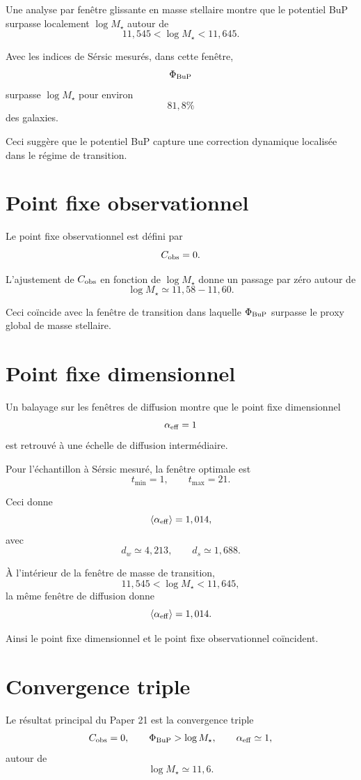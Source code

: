 \documentclass[11pt,a4paper]{article}
\begin{document}
Une analyse par fenêtre glissante en masse stellaire montre que le potentiel BuP surpasse localement \(\log M_\star\) autour de
\[
11,545<\log M_\star<11,645.
\]

Avec les indices de Sérsic mesurés, dans cette fenêtre,
\[
\Phi_{\rm BuP}
\]
surpasse \(\log M_\star\) pour environ
\[
81,8\%
\]
des galaxies.

Ceci suggère que le potentiel BuP capture une correction dynamique localisée dans le régime de transition.

\section{Point fixe observationnel}

Le point fixe observationnel est défini par
\[
C_{\rm obs}=0.
\]

L'ajustement de \(C_{\rm obs}\) en fonction de \(\log M_\star\) donne un passage par zéro autour de
\[
\log M_\star\simeq 11,58-11,60.
\]

Ceci coïncide avec la fenêtre de transition dans laquelle \(\Phi_{\rm BuP}\) surpasse le proxy global de masse stellaire.

\section{Point fixe dimensionnel}

Un balayage sur les fenêtres de diffusion montre que le point fixe dimensionnel
\[
\alpha_{\rm eff}=1
\]
est retrouvé à une échelle de diffusion intermédiaire.

Pour l'échantillon à Sérsic mesuré, la fenêtre optimale est
\[
t_{\min}=1,\qquad t_{\max}=21.
\]

Ceci donne
\[
\langle \alpha_{\rm eff}\rangle=1,014,
\]
avec
\[
d_w\simeq4,213,
\qquad
d_s\simeq1,688.
\]

À l'intérieur de la fenêtre de masse de transition,
\[
11,545<\log M_\star<11,645,
\]
la même fenêtre de diffusion donne
\[
\langle \alpha_{\rm eff}\rangle=1,014.
\]

Ainsi le point fixe dimensionnel et le point fixe observationnel coïncident.

\section{Convergence triple}

Le résultat principal du Paper 21 est la convergence triple
\[
C_{\rm obs}=0,
\qquad
\Phi_{\rm BuP}>\log M_\star,
\qquad
\alpha_{\rm eff}\simeq1,
\]
autour de
\[
\log M_\star\simeq11,6.
\]
\end{document}
